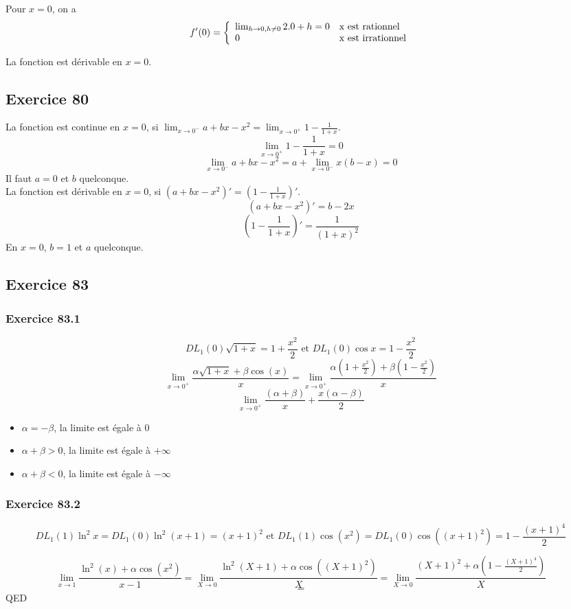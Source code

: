 \documentclass[]{book}
\theoremstyle{definition}
\begin{document}
Pour $x=0$, on a 
$$f'(0) = 
\left\{ 
\begin{array}{l l}
\lim_{h \to 0, h \neq 0} 2.0+h = 0 & \textrm{x est rationnel}\\
0 & \textrm{x est irrationnel}\\
\end{array}
\right. 
$$

La fonction est d\'erivable en $x=0$.


\subsection*{Exercice 80}
La fonction est continue en $x=0$, si $\lim_{x \to 0^{-}} a + bx -x^2 = \lim_{x \to 0^{+}} 1 - \frac{1}{1+x}$.
$$\lim_{x \to 0^{+}} 1 - \frac{1}{1+x} = 0$$
$$\lim_{x \to 0^{-}} a + bx -x^2 = a + \lim_{x \to 0^{-}} x(b-x) = 0$$
Il faut $a=0$ et $b$ quelconque.\\

La fonction est d\'erivable en $x=0$, si $(a + bx -x^2)' = \left(1 - \frac{1}{1+x}\right)'$.
$$(a + bx -x^2)' = b-2x$$
$$\left(1 - \frac{1}{1+x}\right)' = \frac{1}{(1+x)^2}$$
En $x=0$, $b=1$ et $a$ quelconque.



\subsection*{Exercice 83}
\subsubsection*{Exercice 83.1}
$$DL_1(0)\sqrt{1+x} = 1+\frac{x^2}{2} \textrm{   et   } DL_1(0)\cos{x} = 1 - \frac{x^2}{2}$$
$$\lim_{x\to0^{+}} \frac{\alpha\sqrt{1+x} + \beta\cos(x)}{x} = \lim_{x\to0^{+}} \frac{\alpha(1 + \frac{x^2}{2}) + \beta(1 - \frac{x^2}{2})}{x}$$
$$\lim_{x\to0^{+}} \frac{(\alpha+\beta)}{x}+\frac{x(\alpha-\beta)}{2}$$

\begin{itemize}
\item $\alpha = -\beta$, la limite est \'egale \`a $0$
\item $\alpha + \beta > 0$, la limite est \'egale \`a $+\infty$
\item $\alpha + \beta < 0$, la limite est \'egale \`a $-\infty$
\end{itemize}

\subsubsection*{Exercice 83.2}
$$DL_1(1)\ln^2{x} = DL_1(0)\ln^2({x+1}) = (x+1)^2 \textrm{   et   } DL_1(1)\cos{(x^2)} = DL_1(0)\cos{((x+1)^2)} = 1 - \frac{(x+1)^4}{2}$$

$$\lim_{x\to1} \frac{\ln^2(x)+\alpha \cos(x^2)}{x-1} = \lim_{X\to0} \frac{\ln^2(X+1)+\alpha \cos((X+1)^2)}{X} = 
\lim_{X\to0} \frac{(X+1)^2+\alpha (1-\frac{(X+1)^4}{2})}{X} $$
$$ =  $$
QED
\end{document}
